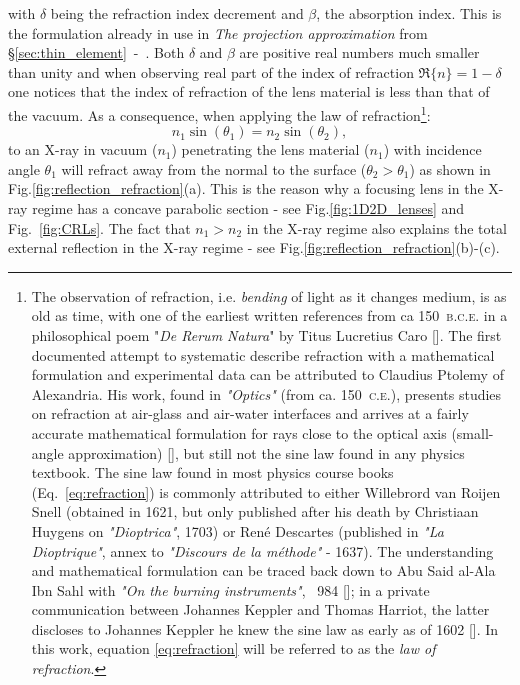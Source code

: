 \begin{refsection}
with $\delta$ being the refraction index decrement and $\beta$, the absorption index. This is the formulation already in use in \textit{The projection approximation} from \S\ref{sec:thin_element}~-~\textit{}. Both $\delta$ and $\beta$ are positive real numbers much smaller than unity and when observing real part of the index of refraction $\Re\{{n}\}=1-\delta$ one notices that the index of refraction of the lens material is less than that of the vacuum. As a consequence, when applying the law of refraction\footnote{The observation of refraction, i.e. \textit{bending} of light as it changes medium, is as old as time, with one of the earliest written references from ca 150~\textsc{b.c.e.} in a philosophical poem "\textit{De Rerum Natura}" by Titus Lucretius Caro [\cite{Wilk2004}]. The first documented attempt to systematic describe refraction with a mathematical formulation and experimental data can be attributed to Claudius Ptolemy of Alexandria. His work, found in \textit{"Optics"} (from ca. 150~\textsc{c.e.}), presents studies on refraction at air-glass and air-water interfaces and arrives at a fairly accurate mathematical formulation for rays close to the optical axis (small-angle approximation) [\cite{Kwan2002}], but still not the sine law found in any physics textbook. The sine law found in most physics course books (Eq.~\ref{eq:refraction}) is commonly attributed to either Willebrord van Roijen Snell (obtained in 1621, but only published after his death by Christiaan Huygens on \textit{"Dioptrica"}, 1703) or Ren\'{e} Descartes (published in \textit{"La Dioptrique"}, annex to \textit{"Discours de la m\'{e}thode"} - 1637). The understanding and mathematical formulation can be traced back down to Abu Said al-Ala Ibn Sahl with \textit{"On the burning instruments"}, ~984 [\cite{Rashed1990}]; in a private communication between Johannes Keppler and Thomas Harriot, the latter discloses to Johannes Keppler he knew the sine law as early as of 1602 [\cite{Kwan2002,Lohne1956}]. In this work, equation \ref{eq:refraction} will be referred to as the \textit{law of refraction}.}:
\begin{equation}\label{eq:refraction}
    n_1\sin(\theta_1)= n_2\sin(\theta_2),
\end{equation}
to an X-ray in vacuum ($n_1$) penetrating the lens material ($n_1$) with incidence angle $\theta_1$ will refract away from the normal to the surface ($\theta_2>\theta_1$) as shown in Fig.\ref{fig:reflection_refraction}(a). This is the reason why a focusing lens in the X-ray regime has a concave parabolic section - see Fig.\ref{fig:1D2D_lenses} and Fig.~\ref{fig:CRLs}. The fact that $n_1>n_2$ in the X-ray regime also explains the total external reflection in the X-ray regime - see Fig.\ref{fig:reflection_refraction}(b)-(c).


\end{refsection}
